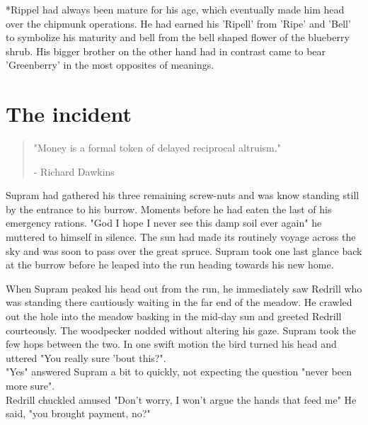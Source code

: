 \documentclass[smalldemyvopaper,11pt,twoside,onecolumn,openright,extrafontsizes]{memoir}
\begin{document}
*Rippel had always been mature for his age, which eventually made him head over the chipmunk operations. He had earned his 'Ripell' from 'Ripe' and 'Bell' to symbolize his maturity and bell from the bell shaped flower of the blueberry shrub. His bigger brother on the other hand had in contrast came to bear 'Greenberry' in the most opposites of meanings.  

\chapter{The incident}

\vspace{-1.3cm}
\begin{localsize}{10}
	\begin{quote}
		"Money is a formal token of delayed reciprocal altruism."
		\begin{flushright}- Richard Dawkins \end{flushright}
	\end{quote} 
\end{localsize}
\vspace{1cm}


Supram had gathered his three remaining screw-nuts and was know standing still by the entrance to his burrow. Moments before he had eaten the last of his 
emergency rations. "God I hope I never see this damp soil ever again" he muttered to himself in silence. The sun had made its routinely voyage across the sky and was soon to pass over the great spruce. Supram took one last glance back at the burrow before he leaped into the run heading towards his new home. 

When Supram peaked his head out from the run, he immediately saw Redrill who was standing there cautiously waiting in the far end of the meadow. He crawled out the hole into the meadow basking in the mid-day sun and greeted Redrill courteously. The woodpecker nodded without altering his gaze. Supram took the few hops between the two. In one swift motion the bird turned his head and uttered "You really sure 'bout this?".\\

"Yes" answered Supram a bit to quickly, not expecting the question "never been more sure".\\

Redrill chuckled amused "Don't worry, I won't argue the hands that feed me" He said, "you brought payment, no?"\\
\end{document}
